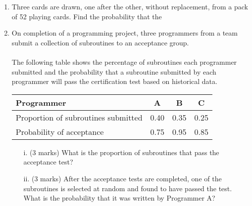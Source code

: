 \documentclass[12pt]{article}
\begin{document}
\begin{enumerate}
\item Three cards are drawn, one after the other, without replacement, from a pack of 52 playing cards.
Find the probability that the





\item
On completion of a programming project, three programmers from a team submit a collection of subroutines to an acceptance group. \\
    \\
    The following table shows the percentage of subroutines each programmer submitted and the probability that a subroutine submitted by each programmer will pass the certification test based on historical data.

\begin{center}
\begin{tabular}{|l|c|c|c|}
  \hline
Programmer &	A	&B	& C	\\\hline
Proportion of subroutines submitted&	0.40	&0.35	&0.25	\\ \hline
Probability of acceptance	&0.75	&0.95	&0.85\\

  \hline
\end{tabular}
\end{center}

\begin{itemize}
\item[i.] (3 marks) What is the proportion of subroutines that pass the acceptance test?
\item[ii.](3 marks)  After the acceptance tests are completed, one of the subroutines is selected at random and found to have passed the test. What is the probability that it was written by Programmer A?
\end{itemize}


\end{enumerate}
\end{document}
